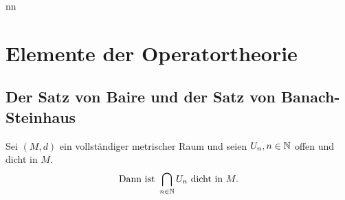 nn%

\chapter*{Elemente der Operatortheorie}  \setcounter{section}{8}



\section{Der Satz von Baire und der Satz von Banach-Steinhaus}



\begin{satz} \label{satz:9.1-baire}
	Sei $(M, d)$ ein vollständiger metrischer Raum und seien $U_{n}, n \in \mathbb{N}$ offen und dicht in $M$.
	\[ \text{Dann ist } \bigcap_{n \in \mathbb{N}} U_{n} \text{ dicht in } M. \]
\end{satz}

